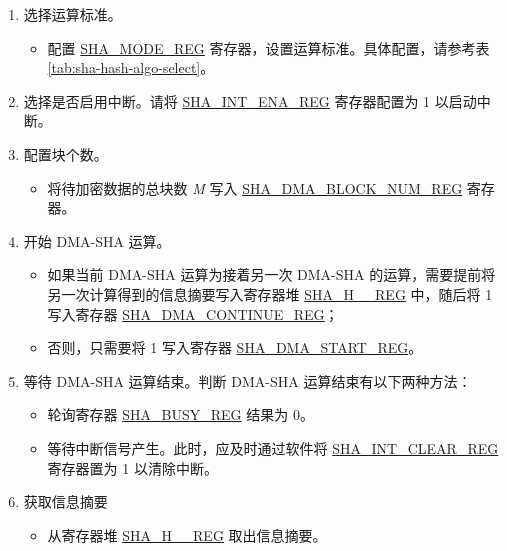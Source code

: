\documentclass[main\_\_CN.tex]{subfiles}
\begin{document}
\begin{enumerate}
    \item 选择运算标准。
    \begin{itemize}
        \item 配置 \hyperref[regdesc:SHAMODEREG]{SHA\_MODE\_REG} 寄存器，设置运算标准。具体配置，请参考表 \ref{tab:sha-hash-algo-select}。
    \end{itemize}
    \item 选择是否启用中断。请将 \hyperref[regdesc:SHAINTENAREG]{SHA\_INT\_ENA\_REG} 寄存器配置为 1 以启动中断。
    \item 配置块个数。
    \begin{itemize}
        \item  将待加密数据的总块数 {\it{M}} 写入  \hyperref[regdesc:SHADMABLOCKNUMREG]{SHA\_DMA\_BLOCK\_NUM\_REG} 寄存器。
    \end{itemize}
    \item 开始 DMA-SHA 运算。
        \begin{itemize}
            \item 如果当前 DMA-SHA 运算为接着另一次 DMA-SHA 的运算，需要提前将另一次计算得到的信息摘要写入寄存器堆 \hyperref[regdesc:SHAHNREG]{SHA\_H\_\_REG} 中，随后将 1 写入寄存器 \hyperref[regdesc:SHADMACONTINUEREG]{SHA\_DMA\_CONTINUE\_REG}；
            \item 否则，只需要将 1 写入寄存器 \hyperref[regdesc:SHADMASTARTREG]{SHA\_DMA\_START\_REG}。
        \end{itemize}
    \item 等待 DMA-SHA 运算结束。判断 DMA-SHA 运算结束有以下两种方法：
        \begin{itemize}
            \item 轮询寄存器 \hyperref[regdesc:SHABUSYREG]{SHA\_BUSY\_REG} 结果为 0。
            \item 等待中断信号产生。此时，应及时通过软件将 \hyperref[regdesc:SHAINTCLEARREG]{SHA\_INT\_CLEAR\_REG} 寄存器置为 1 以清除中断。
        \end{itemize}
    
    \item 获取信息摘要
    \begin{itemize}
        \item 从寄存器堆 \hyperref[regdesc:SHAHNREG]{SHA\_H\_\_REG} 取出信息摘要。
    \end{itemize}
    
\end{enumerate}
\end{document}
